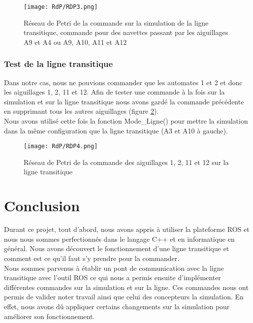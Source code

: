 \documentclass[a4paper,french, titlepage]{book}
\begin{document}
\begin{figure}[H] 
\begin{center}
\texttt{[image: RdP/RDP3.png]} 
\end{center}
\caption{Réseau de Petri de la commande sur la simulation de la ligne transitique, commande pour des navettes passant par les aiguillages A9 et A4 ou A9, A10, A11 et A12}
\label{RdP_9101112_simu}
\end{figure}



\subsection{Test de la ligne transitique}

Dans notre cas, nous ne pouvions commander que les automates 1 et 2 et donc les aiguillages 1, 2, 11 et 12. Afin de tester une commande à la fois sur la simulation et sur la ligne transitique nous avons gardé la commande précédente en supprimant tous les autres aiguillages (figure \ref{RdP_lign_simu}).\\

Nous avons utilisé cette fois la fonction Mode\_Ligne() pour mettre la simulation dans la même configuration que la ligne transitique (A3 et A10 à gauche).\\



\begin{figure}[H] 
\begin{center}
\texttt{[image: RdP/RDP4.png]} 
\end{center}
\caption{Réseau de Petri de la commande des aiguillages 1, 2, 11 et 12 sur la ligne transitique}
\label{RdP_lign_simu}
\end{figure}



\newpage
{}
\chapter*{Conclusion}


Durant ce projet, tout d'abord, nous avons appris à utiliser la plateforme ROS et nous nous sommes perfectionnés dans le langage C++ et en informatique en général. Nous avons découvert le fonctionnement d'une ligne transitique et comment est ce qu'il faut s'y prendre pour la commander.\\

Nous sommes parvenus à établir un pont de communication avec la ligne transitique avec l'outil ROS ce qui nous a permis ensuite d'implémenter différentes commandes sur la simulation et sur la ligne. Ces commandes nous ont permis de valider noter travail ainsi que celui des concepteurs la simulation. En effet, nous avons dû appliquer certains changements sur la simulation pour améliorer son fonctionnement.\\
\end{document}
